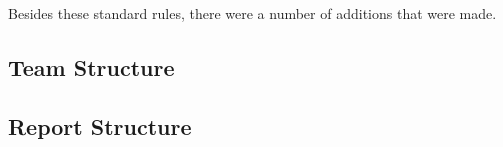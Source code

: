 
Besides these standard rules, there were a number of additions that were made. 


\subsection{Team Structure}\label{sec:team struct}


\subsection{Report Structure}\label{sec:report struct}

% 

